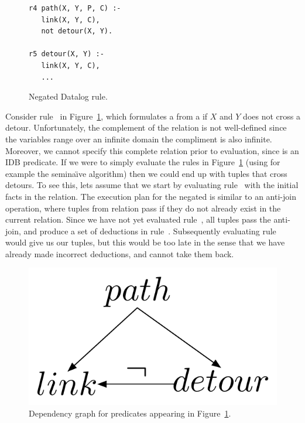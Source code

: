 \begin{figure}
\centering
\ssp
\begin{lstlisting}
r4 path(X, Y, P, C) :-
   link(X, Y, C),
   not detour(X, Y).

r5 detour(X, Y) :-
   link(X, Y, C),
   ... 
\end{lstlisting}
\caption{\label{ch:p2:fig:negation}Negated Datalog rule.}
\end{figure}

Consider rule~ in Figure~\ref{ch:p2:fig:negation}, which formulates a
 from a  if $X$ and $Y$ does not cross a detour.
Unfortunately, the complement of the  relation is not well-defined
since the variables range over an infinite domain the compliment is also
infinite.  Moreover, we cannot specify this complete relation prior to
evaluation, since  is an IDB predicate.  If we were to simply
evaluate the rules in Figure~\ref{ch:p2:fig:negation} (using for example the
semina\"{\i}ve algorithm) then we could end up with  tuples that cross
detours.  To see this, lets assume that we start by evaluating rule~
with the initial facts in the  relation.  The execution plan for the
negated  is similar to an anti-join operation, where tuples from
 relation pass if they do not already exist in the current 
relation.  Since we have not yet evaluated rule~, all  tuples
pass the anti-join, and produce a set of  deductions in rule~.
Subsequently evaluating rule~ would give us our  tuples, but
this would be too late in the sense that we have already made incorrect
deductions, and cannot take them back.

\begin{figure} 
\ssp
\begin{center}
\includegraphics[scale=0.75]{figures/dependency-graph}
\caption{\label{ch:p2:fig:dependency}Dependency graph for predicates 
appearing in Figure~\ref{ch:p2:fig:negation}.}
\end{center} 
\end{figure}

